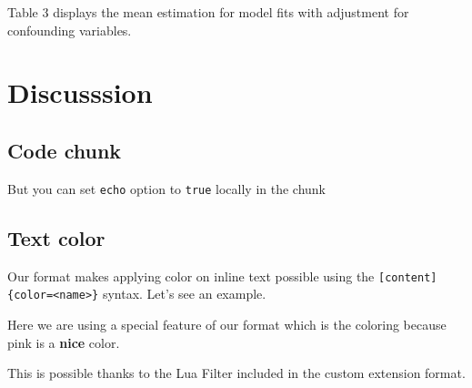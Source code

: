 \documentclass[
]{aft}
\begin{document}
Table 3 displays the mean estimation for model fits with adjustment for
confounding variables.

\section{Discusssion}\label{discusssion}

\subsection{Code chunk}\label{sec-chunks}

But you can set \texttt{echo} option to \texttt{true} locally in the
chunk

\subsection{Text color}\label{sec-summary}

Our format makes applying color on inline text possible using the
\texttt{{[}content{]}\{color=\textless{}name\textgreater{}\}} syntax.
Let's see an example.

Here we are using a special feature of our format which is the coloring
because \textcolor{mypink}{pink is a \textbf{nice} color}.

This is possible thanks to the Lua Filter included in the custom
extension format.


  
\end{document}
